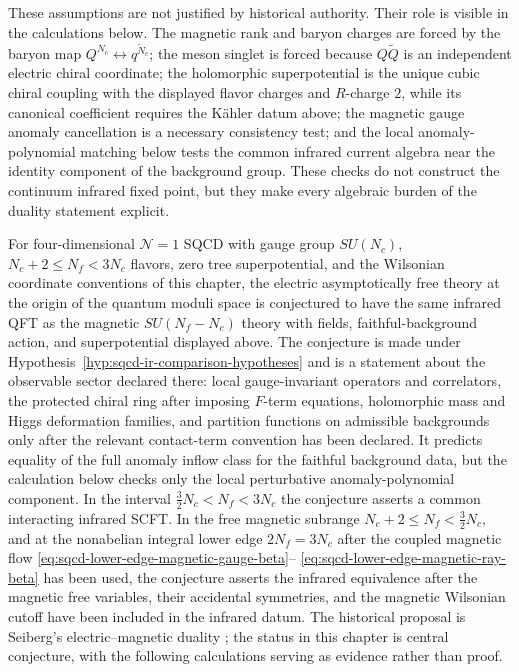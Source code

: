 These assumptions are not justified by historical authority.  Their role is
visible in the calculations below.  The magnetic rank and baryon charges are
forced by the baryon map \(Q^{N_c}\leftrightarrow q^{\widetilde N_c}\);
the meson singlet is forced because \(Q\widetilde Q\) is an independent
  electric chiral coordinate; the holomorphic superpotential is the unique
  cubic chiral coupling with the displayed flavor charges and \(R\)-charge
  \(2\), while its canonical coefficient requires the Kähler datum above; the
magnetic gauge anomaly cancellation is a necessary consistency test; and the
local anomaly-polynomial matching below tests the common infrared current
algebra near the identity component of the background group.  These checks do
not construct the continuum infrared fixed point, but they make every
algebraic burden of the duality statement explicit.

\begin{conjecture}
\label{conj:sqcd-seiberg-duality-central}
For four-dimensional \(\mathcal N=1\) SQCD with gauge group \(SU(N_c)\),
\(N_c+2\leq N_f<3N_c\) flavors, zero tree superpotential, and the Wilsonian
coordinate conventions of this chapter, the electric asymptotically free
theory at the origin of the quantum moduli space is conjectured to have the
same infrared QFT as the magnetic \(SU(N_f-N_c)\) theory with fields,
faithful-background action, and superpotential displayed above.  The
conjecture is made under
Hypothesis~\ref{hyp:sqcd-ir-comparison-hypotheses} and is a statement about
the observable sector declared there: local gauge-invariant operators and
correlators, the protected chiral ring after imposing \(F\)-term equations,
holomorphic mass and Higgs deformation families, and partition functions on
admissible backgrounds only after the relevant contact-term convention has
been declared.  It predicts equality of the full anomaly inflow class for the
faithful background data, but the calculation below checks only the local
perturbative anomaly-polynomial component.  In the interval
\(\frac32N_c<N_f<3N_c\) the conjecture asserts a common interacting infrared
SCFT.  In the free magnetic subrange \(N_c+2\leq N_f<\frac32N_c\), and at the
nonabelian integral lower edge \(2N_f=3N_c\) after the coupled magnetic flow
\eqref{eq:sqcd-lower-edge-magnetic-gauge-beta}--
\eqref{eq:sqcd-lower-edge-magnetic-ray-beta} has been used, the conjecture
asserts the infrared equivalence after the magnetic free variables, their
accidental symmetries, and the magnetic Wilsonian cutoff have been included
in the infrared datum.  The historical proposal is Seiberg's
electric--magnetic duality \cite{Seiberg1994}; the status in this chapter is
central conjecture, with the following calculations serving as evidence
rather than proof.
\end{conjecture}


